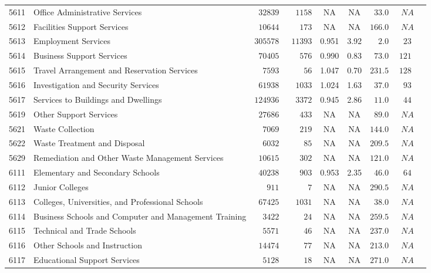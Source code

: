 \documentclass[9pt, oneside]{article}   	%
\begin{document}
\begin{longtable}{lp{3 in}ccccccc}
5611  & Office Administrative Services & $\phantom{0}32839$ & $\phantom{00}1158$ &    NA &    NA & $\phantom{0}33.0$ & $\phantom{0}NA$ \\
5612  & Facilities Support Services & $\phantom{0}10644$ & $\phantom{000}173$ &    NA &    NA & $166.0$ & $\phantom{0}NA$ \\
5613  & Employment Services & $305578$ & $\phantom{0}11393$ & 0.951 &  3.92 & $\phantom{00}2.0$ & $\phantom{0}23$ \\
5614  & Business Support Services & $\phantom{0}70405$ & $\phantom{000}576$ & 0.990 &  0.83 & $\phantom{0}73.0$ & $121$ \\
5615  & Travel Arrangement and Reservation Services & $\phantom{00}7593$ & $\phantom{0000}56$ & 1.047 &  0.70 & $231.5$ & $128$ \\
5616  & Investigation and Security Services & $\phantom{0}61938$ & $\phantom{00}1033$ & 1.024 &  1.63 & $\phantom{0}37.0$ & $\phantom{0}93$ \\
5617  & Services to Buildings and Dwellings & $124936$ & $\phantom{00}3372$ & 0.945 &  2.86 & $\phantom{0}11.0$ & $\phantom{0}44$ \\
5619  & Other Support Services & $\phantom{0}27686$ & $\phantom{000}433$ &    NA &    NA & $\phantom{0}89.0$ & $\phantom{0}NA$ \\

5621  & Waste Collection & $\phantom{00}7069$ & $\phantom{000}219$ &    NA &    NA & $144.0$ & $\phantom{0}NA$ \\
5622  & Waste Treatment and Disposal & $\phantom{00}6032$ & $\phantom{0000}85$ &    NA &    NA & $209.5$ & $\phantom{0}NA$ \\
5629  & Remediation and Other Waste Management Services & $\phantom{0}10615$ & $\phantom{000}302$ &    NA &    NA & $121.0$ & $\phantom{0}NA$ \\
6111  & Elementary and Secondary Schools & $\phantom{0}40238$ & $\phantom{000}903$ & 0.953 &  2.35 & $\phantom{0}46.0$ & $\phantom{0}64$ \\
6112  & Junior Colleges & $\phantom{000}911$ & $\phantom{00000}7$ &    NA &    NA & $290.5$ & $\phantom{0}NA$ \\
6113  & Colleges, Universities, and Professional Schools & $\phantom{0}67425$ & $\phantom{00}1031$ &    NA &    NA & $\phantom{0}38.0$ & $\phantom{0}NA$ \\
6114  & Business Schools and Computer and Management Training & $\phantom{00}3422$ & $\phantom{0000}24$ &    NA &    NA & $259.5$ & $\phantom{0}NA$ \\
6115  & Technical and Trade Schools & $\phantom{00}5571$ & $\phantom{0000}46$ &    NA &    NA & $237.0$ & $\phantom{0}NA$ \\
6116  & Other Schools and Instruction & $\phantom{0}14474$ & $\phantom{0000}77$ &    NA &    NA & $213.0$ & $\phantom{0}NA$ \\
6117  & Educational Support Services & $\phantom{00}5128$ & $\phantom{0000}18$ &    NA &    NA & $271.0$ & $\phantom{0}NA$ \\


\end{longtable}
\end{document}

